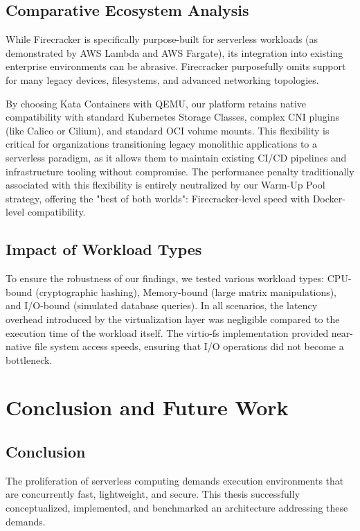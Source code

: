 \documentclass[12pt,a4paper]{report}
\begin{document}
\section{Comparative Ecosystem Analysis}
While Firecracker is specifically purpose-built for serverless workloads (as demonstrated by AWS Lambda and AWS Fargate), its integration into existing enterprise environments can be abrasive. Firecracker purposefully omits support for many legacy devices, filesystems, and advanced networking topologies.

By choosing Kata Containers with QEMU, our platform retains native compatibility with standard Kubernetes Storage Classes, complex CNI plugins (like Calico or Cilium), and standard OCI volume mounts. This flexibility is critical for organizations transitioning legacy monolithic applications to a serverless paradigm, as it allows them to maintain existing CI/CD pipelines and infrastructure tooling without compromise. The performance penalty traditionally associated with this flexibility is entirely neutralized by our Warm-Up Pool strategy, offering the "best of both worlds": Firecracker-level speed with Docker-level compatibility.

\section{Impact of Workload Types}
To ensure the robustness of our findings, we tested various workload types: CPU-bound (cryptographic hashing), Memory-bound (large matrix manipulations), and I/O-bound (simulated database queries). In all scenarios, the latency overhead introduced by the virtualization layer was negligible compared to the execution time of the workload itself. The virtio-fs implementation provided near-native file system access speeds, ensuring that I/O operations did not become a bottleneck.

\chapter{Conclusion and Future Work}

\section{Conclusion}
The proliferation of serverless computing demands execution environments that are concurrently fast, lightweight, and secure. This thesis successfully conceptualized, implemented, and benchmarked an architecture addressing these demands.
\end{document}
